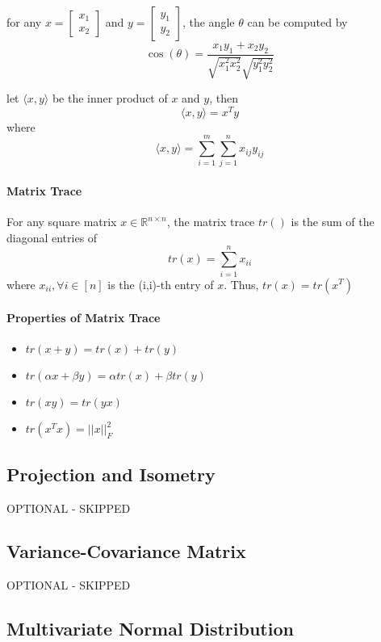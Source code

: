 \documentclass{article}
\theoremstyle{definition}
\theoremstyle{remark}
\begin{document}
for any $x = \begin{bmatrix}
    x_1 \\ x_2
\end{bmatrix}$ and $y = \begin{bmatrix}
    y_1 \\ y_2
\end{bmatrix}$, the angle $\theta$ can be computed by $$\cos(\theta) = \frac{x_1y_1 + x_2y_2}{\sqrt{x_1^2x_2^2}\sqrt{y_1^2y_2^2}}$$

let $\langle x,y \rangle$ be the inner product of $x$ and $y$, then $$\langle x,y \rangle = x^Ty$$ where $$\langle x,y \rangle = \sum_{i=1}^m\sum_{j=1}^nx_{ij}y_{ij}$$

\paragraph{Matrix Trace}

For any square matrix $x \in \mathbb{R}^{n\times n}$, the matrix trace $tr()$ is the sum of the diagonal entries of $$tr(x) = \sum_{i=1}^n x_{ii}$$ where $x_{ii}, \forall i \in [n]$ is the (i,i)-th entry of $x$. Thus, $tr(x) = tr(x^T)$

\paragraph{Properties of Matrix Trace}

\begin{itemize}
    \item $tr(x+y) = tr(x) + tr(y)$
    \item $tr(\alpha x + \beta y) = \alpha tr(x) + \beta tr(y)$
    \item $tr(xy) = tr(yx)$
    \item $tr(x^Tx) = ||x||^2_F$
\end{itemize}

\subsection{Projection and Isometry}

OPTIONAL - SKIPPED

\subsection{Variance-Covariance Matrix}

OPTIONAL - SKIPPED

\subsection{Multivariate Normal Distribution}
\end{document}
